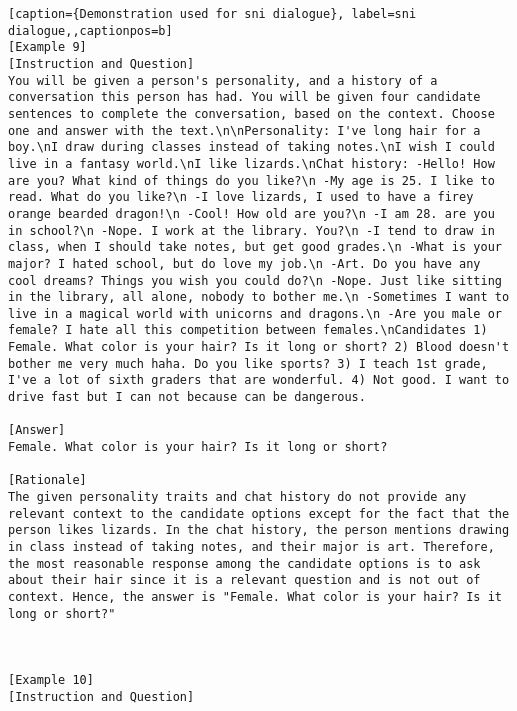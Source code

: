 \begin{lstlisting}[caption={Demonstration used for sni dialogue}, label=sni dialogue,,captionpos=b]
[Example 9]
[Instruction and Question]
You will be given a person's personality, and a history of a conversation this person has had. You will be given four candidate sentences to complete the conversation, based on the context. Choose one and answer with the text.\n\nPersonality: I've long hair for a boy.\nI draw during classes instead of taking notes.\nI wish I could live in a fantasy world.\nI like lizards.\nChat history: -Hello! How are you? What kind of things do you like?\n -My age is 25. I like to read. What do you like?\n -I love lizards, I used to have a firey orange bearded dragon!\n -Cool! How old are you?\n -I am 28. are you in school?\n -Nope. I work at the library. You?\n -I tend to draw in class, when I should take notes, but get good grades.\n -What is your major? I hated school, but do love my job.\n -Art. Do you have any cool dreams? Things you wish you could do?\n -Nope. Just like sitting in the library, all alone, nobody to bother me.\n -Sometimes I want to live in a magical world with unicorns and dragons.\n -Are you male or female? I hate all this competition between females.\nCandidates 1) Female. What color is your hair? Is it long or short? 2) Blood doesn't bother me very much haha. Do you like sports? 3) I teach 1st grade, I've a lot of sixth graders that are wonderful. 4) Not good. I want to drive fast but I can not because can be dangerous.

[Answer]
Female. What color is your hair? Is it long or short?

[Rationale]
The given personality traits and chat history do not provide any relevant context to the candidate options except for the fact that the person likes lizards. In the chat history, the person mentions drawing in class instead of taking notes, and their major is art. Therefore, the most reasonable response among the candidate options is to ask about their hair since it is a relevant question and is not out of context. Hence, the answer is "Female. What color is your hair? Is it long or short?"



[Example 10]
[Instruction and Question]

    \end{lstlisting}
    




